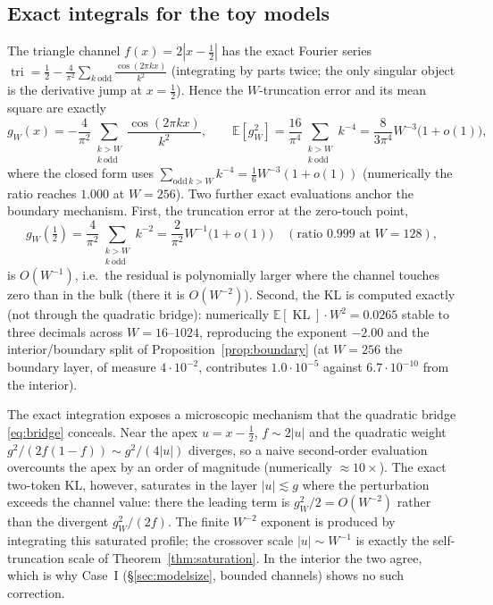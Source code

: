 \documentclass[12pt]{article}
\newcommand{\KL}{\operatorname{KL}}
\newcommand{\E}{\mathbb{E}}
\theoremstyle{remark}
\begin{document}
\subsection{Exact integrals for the toy models}
\label{app:exact}
The triangle channel $f(x)=2|x-\tfrac12|$ has the exact Fourier series
$\operatorname{tri}=\frac12-\frac4{\pi^2}\sum_{k\ \text{odd}}
\frac{\cos(2\pi kx)}{k^2}$ (integrating by parts twice; the only singular
object is the derivative jump at $x=\tfrac12$). Hence the $W$-truncation error
and its mean square are exactly
\begin{equation*}
  g_W(x)=-\frac4{\pi^2}\sum_{\substack{k>W\\ k\ \text{odd}}}
  \frac{\cos(2\pi kx)}{k^2},
  \qquad
  \E[g_W^2]=\frac{16}{\pi^4}\sum_{\substack{k>W\\ k\ \text{odd}}}k^{-4}
  =\frac{8}{3\pi^4}W^{-3}\bigl(1+o(1)\bigr),
\end{equation*}
where the closed form uses $\sum_{\text{odd}\,k>W}k^{-4}=\frac16W^{-3}(1+o(1))$
(numerically the ratio reaches $1.000$ at $W=256$). Two further exact
evaluations anchor the boundary mechanism. First, the truncation error at the
zero-touch point,
\begin{equation*}
  g_W(\tfrac12)=\frac4{\pi^2}\sum_{\substack{k>W\\ k\ \text{odd}}}k^{-2}
  =\frac{2}{\pi^2}W^{-1}\bigl(1+o(1)\bigr)\quad
  (\text{ratio }0.999\text{ at }W=128),
\end{equation*}
is $O(W^{-1})$, i.e.\ the residual is polynomially larger where the channel
touches zero than in the bulk (there it is $O(W^{-2})$). Second, the KL is
computed exactly (not through the quadratic bridge): numerically
$\E[\KL]\cdot W^2=0.0265$ stable to three decimals across $W=16$--$1024$,
reproducing the exponent $-2.00$ and the interior/boundary split of
Proposition~\ref{prop:boundary} (at $W=256$ the boundary layer, of measure
$4\cdot10^{-2}$, contributes $1.0\cdot10^{-5}$ against $6.7\cdot10^{-10}$ from
the interior).

The exact integration exposes a microscopic mechanism that the quadratic
bridge \eqref{eq:bridge} conceals. Near the apex $u=x-\tfrac12$, $f\sim2|u|$ and
the quadratic weight $g^2/(2f(1-f))\sim g^2/(4|u|)$ diverges, so a naive
second-order evaluation overcounts the apex by an order of magnitude
(numerically $\approx10\times$). The exact two-token KL, however, saturates in
the layer $|u|\lesssim g$ where the perturbation exceeds the channel value:
there the leading term is $g_W^2/2=O(W^{-2})$ rather than the divergent
$g_W^2/(2f)$. The finite $W^{-2}$ exponent is produced by integrating this
saturated profile; the crossover scale $|u|\sim W^{-1}$ is exactly the
self-truncation scale of Theorem~\ref{thm:saturation}. In the interior the
two agree, which is why Case~I (\S\ref{sec:modelsize}, bounded channels) shows no
such correction.
\end{document}
